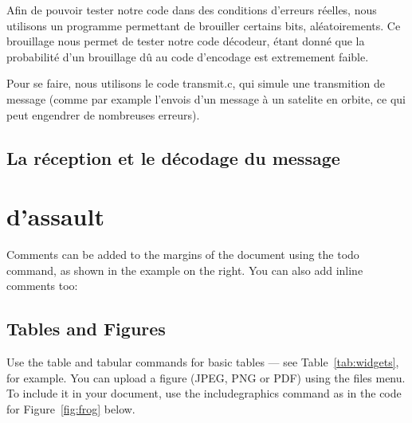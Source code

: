Afin de pouvoir tester notre code dans des conditions d'erreurs réelles, nous utilisons un programme permettant de brouiller certains bits, aléatoirements. Ce brouillage nous permet de tester notre code décodeur, étant donné que la probabilité d'un brouillage dû au code d'encodage est extremement faible.

Pour se faire, nous utilisons le code transmit.c, qui simule une transmition de message (comme par example l'envois d'un message à un satelite en orbite, ce qui peut engendrer de nombreuses erreurs).



\subsection{La réception et le décodage du message}
\label{sub:La réception et le décodage du message}



\section{d'assault}
\label{sec:assault}


Comments can be added to the margins of the document using the  todo command, as shown in the example on the right. You can also add inline comments too:


\subsection{Tables and Figures}

Use the table and tabular commands for basic tables --- see Table~\ref{tab:widgets}, for example. You can upload a figure (JPEG, PNG or PDF) using the files menu. To include it in your document, use the includegraphics command as in the code for Figure~\ref{fig:frog} below.



